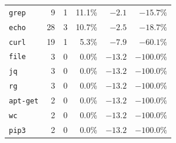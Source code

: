 \documentclass{article}
\begin{document}
\begin{table}[t]
\begin{tabular}{@{}lrrrrr@{}}
\midrule
\texttt{grep}       &  9 &  1 & 11.1\% & \textcolor{liftnegative}{$-2.1$}  & \textcolor{liftnegative}{$-15.7\%$}  \\
\rowcolor{tablestripebg}
\texttt{echo}       & 28 &  3 & 10.7\% & \textcolor{liftnegative}{$-2.5$}  & \textcolor{liftnegative}{$-18.7\%$}  \\
\texttt{curl}       & 19 &  1 &  5.3\% & \textcolor{liftnegative}{$-7.9$}  & \textcolor{liftnegative}{$-60.1\%$}  \\
\rowcolor{tablestripebg}
\texttt{file}       &  3 &  0 &  0.0\% & \textcolor{liftnegative}{$-13.2$} & \textcolor{liftnegative}{$-100.0\%$} \\
\texttt{jq}         &  3 &  0 &  0.0\% & \textcolor{liftnegative}{$-13.2$} & \textcolor{liftnegative}{$-100.0\%$} \\
\rowcolor{tablestripebg}
\texttt{rg}         &  3 &  0 &  0.0\% & \textcolor{liftnegative}{$-13.2$} & \textcolor{liftnegative}{$-100.0\%$} \\
\texttt{apt-get}    &  2 &  0 &  0.0\% & \textcolor{liftnegative}{$-13.2$} & \textcolor{liftnegative}{$-100.0\%$} \\
\rowcolor{tablestripebg}
\texttt{wc}         &  2 &  0 &  0.0\% & \textcolor{liftnegative}{$-13.2$} & \textcolor{liftnegative}{$-100.0\%$} \\
\texttt{pip3}       &  2 &  0 &  0.0\% & \textcolor{liftnegative}{$-13.2$} & \textcolor{liftnegative}{$-100.0\%$} \\
\bottomrule
\end{tabular}
\vspace{-15pt}
\end{table}

\newpage

\end{document}
